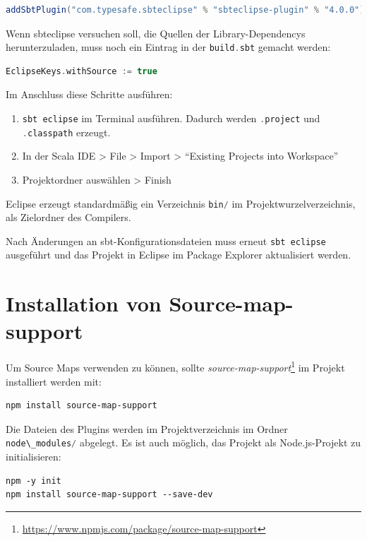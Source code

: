 \documentclass[a4paper, 12pt, hidelinks, listof=totoc, listoftables=totoc, bibliography=totoc]{scrreprt}
\newcommand{\code}[1]{\lstinline[language=Scala, style=inline]|#1|}
\begin{document}
\begin{lstlisting}[language=Scala, style=snippet]
addSbtPlugin("com.typesafe.sbteclipse" % "sbteclipse-plugin" % "4.0.0")
\end{lstlisting}

Wenn sbteclipse versuchen soll, die Quellen der Library-Dependencys herunterzuladen, muss noch ein Eintrag in der \code{build.sbt} gemacht werden:

\begin{lstlisting}[language=Scala, style=snippet]
EclipseKeys.withSource := true
\end{lstlisting}

Im Anschluss diese Schritte ausführen:

\begin{enumerate}
\item \code{sbt eclipse} im Terminal ausführen. Dadurch werden
\code{.project} und \code{.classpath} erzeugt.
\item In der Scala IDE > File > Import > "`Existing Projects into Workspace"'
\item Projektordner auswählen > Finish
\end{enumerate}

Eclipse erzeugt standardmäßig ein Verzeichnis \code{bin/} im Projektwurzelverzeichnis, als Zielordner des Compilers.

Nach Änderungen an sbt-Konfigurationsdateien muss erneut \code{sbt eclipse} ausgeführt und das Projekt in Eclipse im Package Explorer aktualisiert werden.



\section{Installation von Source-map-support}

Um Source Maps verwenden zu können, sollte \emph{source-map-support}\footnote{\url{https://www.npmjs.com/package/source-map-support}} im Projekt installiert werden mit:

\begin{lstlisting}[style=snippet]
npm install source-map-support
\end{lstlisting}

Die Dateien des Plugins werden im Projektverzeichnis im Ordner \mbox{\code{node\_modules/}} abgelegt. Es ist auch möglich, das Projekt als Node.js-Projekt zu initialisieren:

\begin{lstlisting}[style=snippet]
npm -y init
npm install source-map-support --save-dev
\end{lstlisting}
\end{document}
